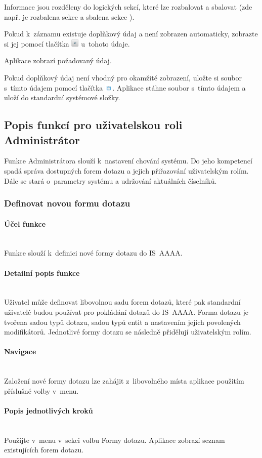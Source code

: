 \documentclass[thesis=M,czech]{FITthesis}[2019/12/23]
\newcommand{\lbparagraph}[1]{\paragraph{#1}\mbox{}\\} %
\begin{document}
Informace jsou rozděleny do logických sekcí, které lze rozbalovat a sbalovat (zde např. je rozbalena sekce  a sbalena sekce ).

Pokud k~záznamu existuje doplňkový údaj a není zobrazen automaticky, zobrazte si jej pomocí tlačítka \includegraphics[height=1em]{res/guide/SearchIcon.png} u~tohoto údaje.

Aplikace zobrazí požadovaný údaj.

Pokud doplňkový údaj není vhodný pro okamžité zobrazení, uložte si soubor s~tímto údajem pomocí tlačítka \includegraphics[height=1em]{res/guide/SaveIcon.png}. Aplikace stáhne soubor s~tímto údajem a uloží do standardní systémové složky.

\subsection{Popis funkcí pro uživatelskou roli Administrátor}
Funkce Administrátora slouží k~nastavení chování systému. Do jeho kompetencí spadá správa dostupných forem dotazu a jejich přiřazování uživatelským rolím. Dále se stará o~parametry systému a udržování aktuálních číselníků.

\newpage
\subsubsection{Definovat novou formu dotazu}
\lbparagraph{Účel funkce}
Funkce slouží k~definici nové formy dotazu do IS~AAAA.

\lbparagraph{Detailní popis funkce}
Uživatel může definovat libovolnou sadu forem dotazů, které pak standardní uživatelé budou používat pro pokládání dotazů do IS~AAAA. Forma dotazu je tvořena sadou typů dotazu, sadou typů entit a nastavením jejich povolených modifikátorů. Jednotlivé formy dotazu se následně přidělují uživatelským rolím.

\lbparagraph{Navigace}
Založení nové formy dotazu lze zahájit z~libovolného místa aplikace použitím příslušné volby v~menu.

\lbparagraph{Popis jednotlivých kroků}
Použijte v~menu v~sekci  volbu Formy dotazu.
Aplikace zobrazí seznam existujících forem dotazu.
\end{document}

